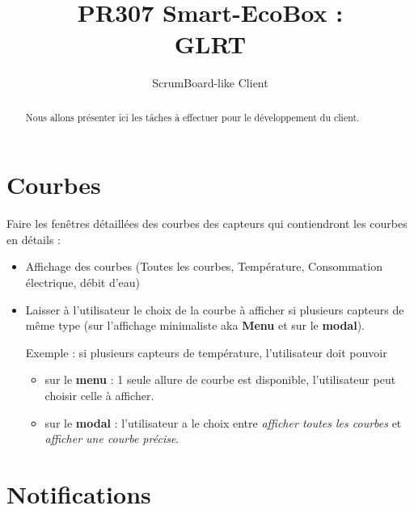 \documentclass[10pt,a4paper]{article}
\title{PR307 Smart-EcoBox : \\ GLRT}
\subtitle{ScrumBoard-like Client}
\author{}
\begin{document}
\maketitle
\begin{abstract}
Nous allons présenter ici les tâches à effectuer pour le développement du client. 
\end{abstract}



\section{Courbes}

Faire les fenêtres détaillées des courbes des capteurs qui contiendront les courbes en détails :

\begin{itemize}[label=$\bullet$]
\setlength\itemsep{1em}
    \item Affichage des courbes (Toutes les courbes, Température, Consommation électrique, débit d'eau)
    
    \item Laisser à l'utilisateur le choix de la courbe à afficher si plusieurs capteurs de même type (sur l'affichage minimaliste aka \textbf{Menu} et sur le \textbf{modal}).
    
    Exemple : si plusieurs capteurs de température, l'utilisateur doit pouvoir 
    \begin{itemize}[label=$\circ$]
    \item sur le \textbf{menu} : 1 seule allure de courbe est disponible, l'utilisateur peut choisir celle à afficher.
    \item sur le \textbf{modal} : l'utilisateur a le choix entre \textit{afficher toutes les courbes} et \textit{afficher une courbe précise}.
    \end{itemize}
\end{itemize}

\section{Notifications}
\end{document}
